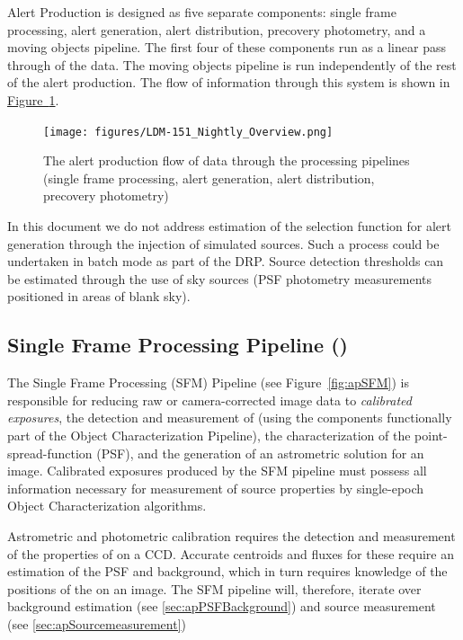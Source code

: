 Alert Production is designed as five separate components: single frame processing, alert generation, alert distribution, precovery photometry, and a moving objects pipeline. The first four of these components run as a linear pass through of the data. The moving objects pipeline is run independently of the rest of the alert production. The flow of information through this system is shown in \hyperref[fig:nightly]{Figure~\ref{fig:nightly}}.

\begin{figure}
\begin{center}
\texttt{[image: figures/LDM-151\_Nightly\_Overview.png]}
\caption{\label{fig:nightly} The alert production flow of data through the processing pipelines (single frame processing, alert generation,  alert distribution, precovery photometry) }
\end{center}
\end{figure}

In this document we do not address estimation of the selection function for alert generation through the injection of simulated sources. Such a process could be undertaken in batch mode as part of the DRP. Source detection thresholds can be estimated through the use of sky sources (PSF photometry measurements positioned in areas of blank sky).

\subsection{Single Frame Processing Pipeline (\wbsSFM)}
\label{sec:apSingleFrameProcessing}

The Single Frame Processing (SFM) Pipeline (see Figure~\ref{fig:apSFM}) is responsible for reducing raw or camera-corrected image data to \emph{calibrated exposures}, the detection and measurement of \Sources (using the components functionally  part of the Object Characterization Pipeline), the characterization of the point-spread-function (PSF), and the generation of an astrometric solution for an image. Calibrated exposures produced by the SFM pipeline must possess all information necessary for measurement of source properties by single-epoch Object Characterization algorithms.

Astrometric and photometric calibration requires the detection and measurement of the properties of \Sources on a CCD. Accurate centroids and fluxes for these \Sources require an estimation of the PSF and background, which in turn requires knowledge of the positions of the \Sources on an image. The SFM pipeline will, therefore, iterate over background estimation (see \ref{sec:apPSFBackground}) and source measurement (see \ref{sec:apSourcemeasurement})

